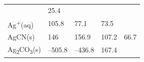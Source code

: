 \documentclass[
  9pt,
]{extbook}
\theoremstyle{definition}
\theoremstyle{definition}
\theoremstyle{definition}
\theoremstyle{remark}
\begin{document}
\begin{longtable}[]{@{}lllll@{}}
\begin{minipage}[t]{0.18\columnwidth}
\end{minipage} & \begin{minipage}[t]{0.18\columnwidth}\raggedright
25.4\strut
\end{minipage}\tabularnewline
\begin{minipage}[t]{0.10\columnwidth}\raggedright
Ag\textsuperscript{+}(aq)\strut
\end{minipage} & \begin{minipage}[t]{0.19\columnwidth}\raggedright
105.8\strut
\end{minipage} & \begin{minipage}[t]{0.20\columnwidth}\raggedright
77.1\strut
\end{minipage} & \begin{minipage}[t]{0.18\columnwidth}\raggedright
73.5\strut
\end{minipage} & \begin{minipage}[t]{0.18\columnwidth}\raggedright
\strut
\end{minipage}\tabularnewline
\begin{minipage}[t]{0.10\columnwidth}\raggedright
AgCN(s)\strut
\end{minipage} & \begin{minipage}[t]{0.19\columnwidth}\raggedright
146\strut
\end{minipage} & \begin{minipage}[t]{0.20\columnwidth}\raggedright
156.9\strut
\end{minipage} & \begin{minipage}[t]{0.18\columnwidth}\raggedright
107.2\strut
\end{minipage} & \begin{minipage}[t]{0.18\columnwidth}\raggedright
66.7\strut
\end{minipage}\tabularnewline
\begin{minipage}[t]{0.10\columnwidth}\raggedright
Ag\textsubscript{2}CO\textsubscript{3}(s)\strut
\end{minipage} & \begin{minipage}[t]{0.19\columnwidth}\raggedright
--505.8\strut
\end{minipage} & \begin{minipage}[t]{0.20\columnwidth}\raggedright
--436.8\strut
\end{minipage} & \begin{minipage}[t]{0.18\columnwidth}\raggedright
167.4\strut
\end{minipage} & \begin{minipage}[t]{0.18\columnwidth}\raggedright

\end{minipage}
\end{longtable}
\end{document}
